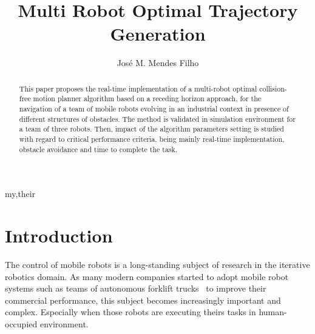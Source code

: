 \documentclass[eprint]{actapoly}
\begin{document}
\title[Trajectory Generation Approach]
{Multi Robot Optimal Trajectory Generation}

\author[J. M. Mendes Filho]{Jos\'{e} M. Mendes Filho}{my,their}


\begin{abstract}

 This paper proposes the real-time implementation of a multi-robot optimal collision-free motion planner
 algorithm based on a receding horizon approach, for the navigation of a team of mobile
 robots evolving in an industrial context in presence of different structures of obstacles.
 The method is validated in simulation environment for a team of three robots. Then, impact of the algorithm
 parameters setting is studied with regard to critical performance criteria, being mainly real-time implementation,
 obstacle avoidance and time to complete the task.
 
\end{abstract}


\maketitle




\section{Introduction}\label{sec:intro}





The %
control of mobile robots is a long-standing subject of research 
in the iterative robotics domain. As many modern companies started to adopt 
mobile robot systems such as teams of autonomous forklift trucks~\cite{Gizmag} 
to improve their commercial performance, this subject becomes increasingly 
important and complex. Especially when those robots are executing theirs tasks 
in human-occupied environment.
\end{document}
